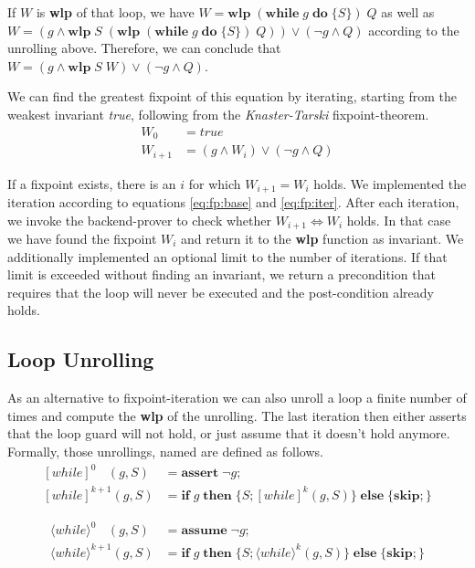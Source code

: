 \documentclass[]{scrartcl}
\newcommand{\WHILE}[2]{\ensuremath{\mathbf{while}\;#1\;\mathbf{do}\;\{#2\}}}
\newcommand{\IF}[3]{\ensuremath{\mathbf{if}\;#1\;\mathbf{then}\;\{#2\}\;\mathbf{else}\;\{#3\}}}
\newcommand{\SKIP}{\ensuremath{\mathbf{skip};}}
\newcommand{\ASSUME}[1]{\ensuremath{\mathbf{assume}\;#1;}}
\newcommand{\ASSERT}[1]{\ensuremath{\mathbf{assert}\;#1;}}
\newcommand{\WLP}[2]{\ensuremath{\mathbf{wlp}\;#1\;#2}}
\newcommand{\UNROLLSQ}[3]{\ensuremath{[\mathit{while}]^{#1}(#2, #3)}}
\newcommand{\UNROLLDI}[3]{\ensuremath{\langle\mathit{while}\rangle^{#1}(#2, #3)}}
\begin{document}
If $W$ is \textbf{wlp} of that loop, we have $W = \WLP{(\WHILE{g}{S})}{Q}$ as well as
$W = (g \land \WLP{S}{(\WLP{(\WHILE{g}{S})}{Q})}) \lor (\neg g \land Q)$ according to the unrolling above.
Therefore, we can conclude that $W = (g \land \WLP{S}{W}) \lor (\neg g \land Q)$.

We can find the greatest fixpoint of this equation by iterating, starting from the weakest invariant \emph{true},
following from the \emph{Knaster-Tarski} fixpoint-theorem.
\begin{align}
  \label{eq:fp:base} W_0 &= \mathit{true} \\
  \label{eq:fp:iter} W_{i+1} &= (g \land W_i) \lor (\neg g \land Q)
\end{align}

If a fixpoint exists, there is an $i$ for which $W_{i+1} = W_i$ holds.
We implemented the iteration according to equations \ref{eq:fp:base} and \ref{eq:fp:iter}.
After each iteration, we invoke the backend-prover to check whether $W_{i+1} \iff W_i$ holds.
In that case we have found the fixpoint $W_i$ and return it to the \textbf{wlp} function as
invariant.
We additionally implemented an optional limit to the number of iterations.
If that limit is exceeded without finding an invariant, we return a precondition that requires
that the loop will never be executed and the post-condition already holds.


\subsection{Loop Unrolling}

As an alternative to fixpoint-iteration we can also unroll a loop a finite number of times and
compute the \textbf{wlp} of the unrolling. The last iteration then either asserts that the
loop guard will not hold, or just assume that it doesn't hold anymore.
Formally, those unrollings, named  are defined as follows.
\begin{align}
\UNROLLSQ{0\phantom{+1}}{g}{S} &= \ASSERT{\neg g} \\
\UNROLLSQ{k+1}{g}{S} &= \IF{g}{S; \UNROLLSQ{k}{g}{S}}{\SKIP}
\end{align}

\begin{align}
\UNROLLDI{0\phantom{+1}}{g}{S} &= \ASSUME{\neg g} \\
\UNROLLDI{k+1}{g}{S} &= \IF{g}{S; \UNROLLDI{k}{g}{S}}{\SKIP}
\end{align}
\end{document}
